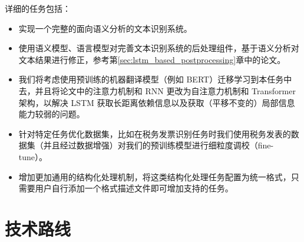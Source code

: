 详细的任务包括：
\begin{itemize}
	\item 实现一个完整的面向语义分析的文本识别系统。
	\item 使用语义模型、语言模型对完善文本识别系统的后处理组件，基于语义分析对文本结果进行修正，参考第\ref{sec:lstm_based_postprocessing}章中的论文。
	\item 我们将考虑使用预训练的机器翻译模型（例如 BERT）迁移学习到本任务中去，并且将论文中的注意力机制和 RNN 更改为自注意力机制和 Transformer 架构，以解决 LSTM 获取长距离依赖信息以及获取（平移不变的）局部信息能力较弱的问题。
	\item 针对特定任务优化数据集，比如在税务发票识别任务时我们使用税务发表的数据集（并且经过数据增强）对我们的预训练模型进行细粒度调校（fine-tune）。
	\item 增加更加通用的结构化处理机制，将这类结构化处理任务配置为统一格式，只需要用户自行添加一个格式描述文件即可增加支持的任务。
\end{itemize}


\chapter{技术路线}
\label{chap:ocr_semantic}

